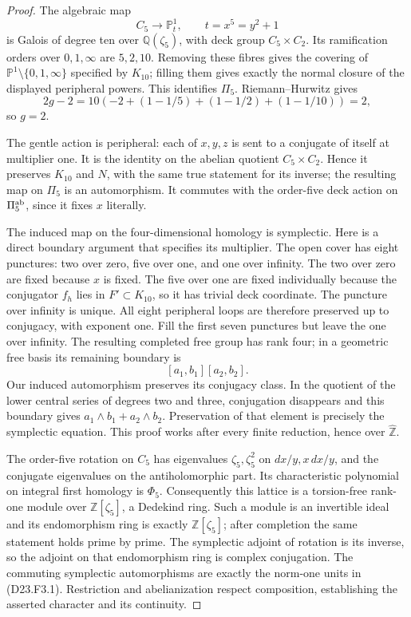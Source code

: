 \begin{proof}
The algebraic map
\[
 C_5\longrightarrow\mathbb P^1_t,
 \qquad t=x^5=y^2+1
\]
is Galois of degree ten over $\mathbb Q(\zeta_5)$, with deck
group $C_5\times C_2$.  Its ramification orders over $0,1,\infty$
are $5,2,10$.  Removing these fibres gives the covering of
$\mathbb P^1\setminus\{0,1,\infty\}$ specified by $K_{10}$;
filling them gives exactly the normal closure of the displayed
peripheral powers.  This identifies $\Pi_5$.  Riemann--Hurwitz
gives
\[
 2g-2=10\left(-2+(1-1/5)+(1-1/2)+(1-1/10)\right)=2,
\]
so $g=2$.

The gentle action is peripheral: each of $x,y,z$ is sent to a
conjugate of itself at multiplier one.  It is the identity on
the abelian quotient $C_5\times C_2$.  Hence it preserves
$K_{10}$ and $N$, with the same true statement for its inverse;
the resulting map on $\Pi_5$ is an automorphism.  It commutes
with the order-five deck action on $\Pi_5^{\rm ab}$, since it
fixes $x$ literally.

The induced map on the four-dimensional homology is symplectic.
Here is a direct boundary argument that specifies its multiplier.
The open cover has eight punctures: two over zero, five over one,
and one over infinity.  The two over zero are fixed because $x$
is fixed.  The five over one are fixed individually because the
conjugator $f_h$ lies in $F'\subset K_{10}$, so it has trivial
deck coordinate.  The puncture over infinity is unique.
All eight peripheral loops are therefore preserved up to conjugacy,
with exponent one.  Fill the first seven punctures but leave
the one over infinity.  The resulting completed free group has
rank four; in a geometric free basis its remaining boundary is
\[
 [a_1,b_1][a_2,b_2].
\]
Our induced automorphism preserves its conjugacy class.  In
the quotient of the lower central series of degrees two and
three, conjugation disappears and this boundary gives
$a_1\wedge b_1+a_2\wedge b_2$.  Preservation of that element
is precisely the symplectic equation.  This proof works after
every finite reduction, hence over $\widehat{\mathbb Z}$.

The order-five rotation on $C_5$ has eigenvalues
$\zeta_5,\zeta_5^2$ on $dx/y,x\,dx/y$, and the conjugate
eigenvalues on the antiholomorphic part.  Its characteristic
polynomial on integral first homology is $\Phi_5$.
Consequently this lattice is a torsion-free rank-one module over
$\mathbb Z[\zeta_5]$, a Dedekind ring.  Such a module is an
invertible ideal and its endomorphism ring is exactly
$\mathbb Z[\zeta_5]$; after completion the same statement
holds prime by prime.  The symplectic adjoint of rotation is
its inverse, so the adjoint on that endomorphism ring is complex
conjugation.  The commuting symplectic automorphisms are exactly
the norm-one units in (D23.F3.1).  Restriction and abelianization
respect composition, establishing the asserted character and
its continuity.


\end{proof}
